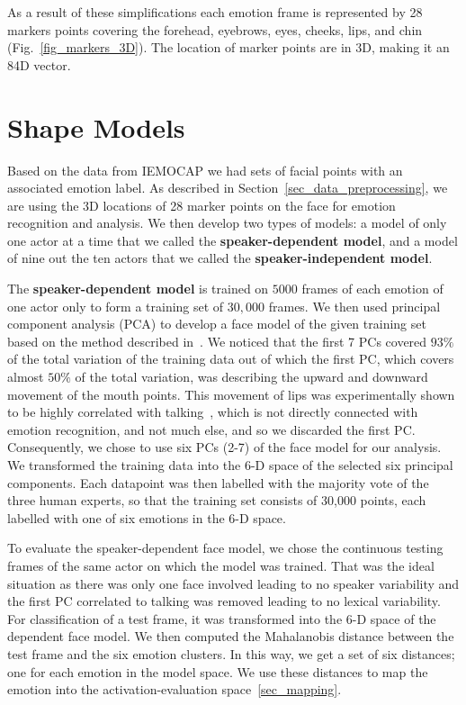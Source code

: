 \documentclass[10pt,journal,cspaper,compsoc]{IEEEtran}
\begin{document}
As a result of these simplifications each emotion frame is represented by 28 markers points covering the forehead, eyebrows, eyes, cheeks, lips, and chin (Fig.~\ref{fig_markers_3D}). The location of marker points are in 3D, making it an 84D vector.

\section{Shape Models}
\label{sec_shape_models}

Based on the data from IEMOCAP we had sets of facial points with an associated emotion label. As described in Section~\ref{sec_data_preprocessing}, we are using the 3D locations of 28 marker points on the face for emotion recognition and analysis. We then develop two types of models: a model of only one actor at a time that we called the \textbf{speaker-dependent model}, and a model of nine out the ten actors that we called the \textbf{speaker-independent model}. 

The \textbf{speaker-dependent model} is trained on $5000$ frames of each emotion of one actor only to form a training set of $30,000$ frames. We then used principal component analysis (PCA) to develop a face model of the given training set based on the method described in~\cite{ayesha hakim shape model paper}. We noticed that the first 7 PCs covered $93\%$ of the total variation of the training data out of which the first PC, which covers almost $50\%$ of the total variation, was describing the upward and downward movement of the mouth points. This movement of lips was experimentally shown to be highly correlated with talking~\cite{ayesha hakim von mises}, which is not directly connected with emotion recognition, and not much else, and so we discarded the first PC. Consequently, we chose to use six PCs (2-7) of the face model for our analysis.
We transformed the training data into the 6-D space of the selected six principal components. Each datapoint was then labelled with the majority vote of the three human experts, so that the training set consists of 30,000 points, each labelled with one of six emotions in the 6-D space. 

To evaluate the speaker-dependent face model, we chose the continuous testing frames of the same actor on which the model was trained. That was the ideal situation as there was only one face involved leading to no speaker variability and the first PC correlated to talking was removed leading to no lexical variability. For classification of a test frame, it was transformed into the 6-D space of the dependent face model. We then computed the Mahalanobis distance between the test frame and the six emotion clusters. In this way, we get a set of six distances; one for each emotion in the model space. We use these distances to map the emotion into the activation-evaluation space~\ref{sec_mapping}.
\end{document}
